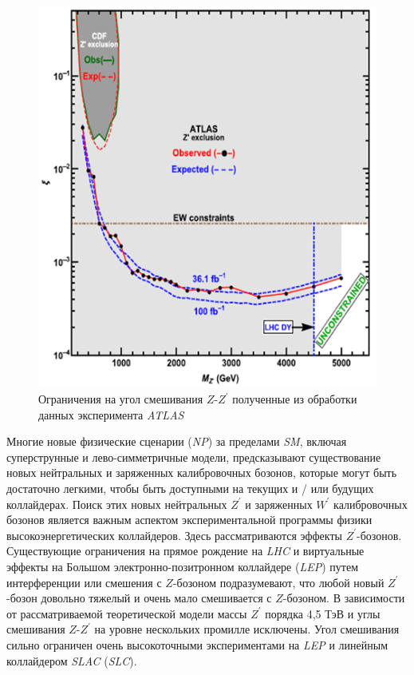 \begin{figure}[!h]
	\centering
	\includegraphics[width=\textwidth]{figures/verify-1.png}
	\caption{Ограничения на угол смешивания $Z$-${Z}^{\prime}$ полученные из обработки данных эксперимента \textit{ATLAS}}
	\label{fig:verify-1}
\end{figure}

Многие новые физические сценарии (\textit{NP}) за пределами \textit{SM}, включая суперструнные и лево-симметричные модели, предсказывают существование новых нейтральных и заряженных калибровочных бозонов, которые могут быть достаточно легкими, чтобы быть доступными на текущих и / или будущих коллайдерах. Поиск этих новых нейтральных ${Z}^{\prime}$ и заряженных ${W}^{\prime}$ калибровочных бозонов является важным аспектом экспериментальной программы физики высокоэнергетических коллайдеров. Здесь рассматриваются  эффекты ${Z}^{\prime}$-бозонов. Существующие ограничения на прямое рождение на \textit{LHC} и виртуальные эффекты на Большом электронно-позитронном коллайдере (\textit{LEP}) путем интерференции или смешения с $Z$-бозоном подразумевают, что любой новый ${Z}^{\prime}$-бозон довольно тяжелый и очень мало смешивается с $Z$-бозоном. В зависимости от рассматриваемой теоретической модели массы ${Z}^{\prime}$ порядка 4,5 ТэВ и углы смешивания $Z$-${Z}^{\prime}$ на уровне нескольких промилле исключены. Угол смешивания сильно ограничен очень высокоточными экспериментами на \textit{LEP} и линейным коллайдером \textit{SLAC} (\textit{SLC}).

